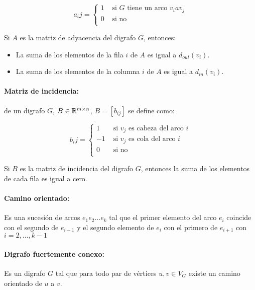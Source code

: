 \[a_ij = \begin{cases}
1 & \text{ si } G \text{ tiene un arco } v_i a v_j \\
0 & \text{ si no } \\
\end{cases}\]

\begin{proposicion}
	Si \(A\) es la matriz de adyacencia del digrafo \(G\), entonces:
	\begin{itemize}
		\item La suma de los elementos de la fila \(i\) de \(A\) es igual a \(d_{out}(v_i)\).
		\item La suma de los elementos de la columna \(i\) de \(A\) es igual a \(d_{in}(v_i)\).
	\end{itemize}
\end{proposicion}

\paragraph{Matriz de incidencia:} de un digrafo \(G\), \(B\in\mathbb{R}^{m\times n}\), \(B = [b_{ij}]\) se define como:

\[b_ij = \begin{cases}
1 & \text{ si } v_j \text{ es cabeza del arco } i \\
-1 & \text{ si } v_j \text{ es cola del arco } i \\
0 & \text{ si no } \\
\end{cases}\]

\begin{proposicion}
	Si \(B\) es la matriz de incidencia del digrafo \(G\), entonces la suma de los elementos de cada fila es igual a cero.
\end{proposicion}

\paragraph{Camino orientado:} Es una sucesión de arcos \(e_1e_2\dots e_k\) tal que el primer elemento del arco \(e_i\) coincide con el segundo de \(e_{i-1}\) y el segundo elemento de \(e_i\) con el primero de \(e_{i+1}\) con \(i = 2,\dots,k-1\)

\paragraph{Digrafo fuertemente conexo:} Es un digrafo \(G\) tal que para todo par de vértices \(u,v\in 	V_G\) existe un camino orientado de \(u\) a \(v\).

